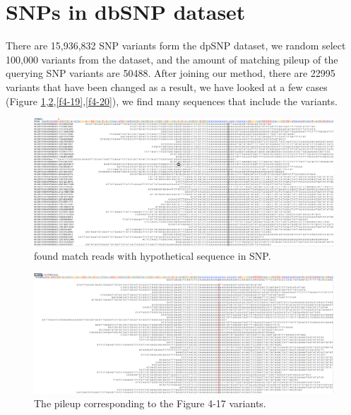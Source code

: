 \section{SNPs in dbSNP dataset}

There are 15,936,832 SNP variants form the dpSNP dataset, we random select 100,000 variants from the dataset, and the amount of matching pileup of the querying SNP variants are 50488. After joining our method, there are 22995 variants that have been changed as a result, we have looked at a few cases (Figure \ref{f4-17},\ref{f4-18},\ref{f4-19},\ref{f4-20}), we find many sequences that include the variants.

\vspace{0.5cm}
\begin{figure}[H]
    \centering
    \includegraphics[width=1\columnwidth]{body/image/4-17.png}
    \captionsetup{labelfont=bf}
    \renewcommand{\baselinestretch}{1.0}
    \vspace{-1cm}
    \caption[SNP match reads]{ found match reads with hypothetical sequence in SNP.}
    \label{f4-17}
\end{figure}

\vspace{0.5cm}
\begin{figure}[H]
    \centering
    \includegraphics[width=1\columnwidth]{body/image/4-18.png}
    \captionsetup{labelfont=bf}
    \renewcommand{\baselinestretch}{1.0}
    \vspace{-1cm}
    \caption[Figure 4.17 pileup]{ The pileup corresponding to the Figure 4-17 variants.}
    \label{f4-18}
\end{figure}

